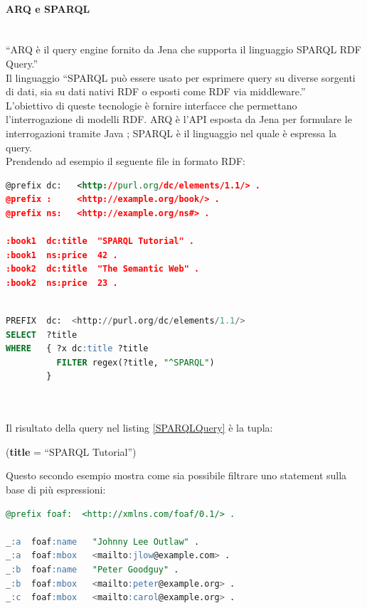 \documentclass[12pt,a4paper,twoside]{book}
\begin{document}
\paragraph{ARQ e SPARQL}\mbox{}\\
``ARQ è il query engine fornito da Jena che supporta il linguaggio SPARQL RDF Query.''\cite{Jena}\\
Il linguaggio ``SPARQL può essere usato per esprimere query su diverse sorgenti di dati, sia su dati nativi RDF o esposti come RDF via middleware.''\cite{SPARQL}\\
L'obiettivo di queste tecnologie è fornire interfacce che permettano l'interrogazione di modelli RDF. ARQ è l'API esposta da Jena per formulare le interrogazioni tramite Java ; SPARQL è il linguaggio nel quale è espressa la query.\\
Prendendo ad esempio il seguente file in formato RDF:\\

\begin{lstlisting}[language=xml,firstnumber=1,caption={File sul quale si vuole eseguire una query},captionpos=b,label=SPARQLRDF]
@prefix dc:   <http://purl.org/dc/elements/1.1/> .
@prefix :     <http://example.org/book/> .
@prefix ns:   <http://example.org/ns#> .

:book1  dc:title  "SPARQL Tutorial" .
:book1  ns:price  42 .
:book2  dc:title  "The Semantic Web" .
:book2  ns:price  23 .

\end{lstlisting}
\begin{lstlisting}[language=sql,firstnumber=1,caption={Query SPARQL per il recupero dei titoli che iniziano per SPARQL},captionpos=b,label=SPARQLQuery]

PREFIX  dc:  <http://purl.org/dc/elements/1.1/>
SELECT  ?title
WHERE   { ?x dc:title ?title
          FILTER regex(?title, "^SPARQL") 
        }
\end{lstlisting}\mbox{}\\ \\  
Il risultato della query nel listing \ref{SPARQLQuery} è la tupla:
\begin{center} (\textbf{title} = ``SPARQL Tutorial'')\end{center}
\newpage
Questo secondo esempio mostra come sia possibile filtrare uno statement sulla base di più espressioni:\\
\begin{lstlisting}[language=sql,firstnumber=1,caption={File sul quale si vuole eseguire una query},captionpos=b,label=SPARQLRDF2]
@prefix foaf:  <http://xmlns.com/foaf/0.1/> .

_:a  foaf:name   "Johnny Lee Outlaw" .
_:a  foaf:mbox   <mailto:jlow@example.com> .
_:b  foaf:name   "Peter Goodguy" .
_:b  foaf:mbox   <mailto:peter@example.org> .
_:c  foaf:mbox   <mailto:carol@example.org> .
\end{lstlisting}\mbox{}
\end{document}
